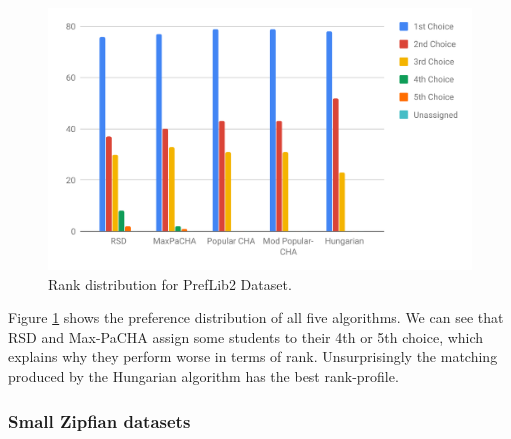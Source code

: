 \begin{figure}[h!]
  \centering
    \includegraphics[width=0.9\linewidth]{assets/plots/preflib2-ranks.pdf}    
    \caption{Rank distribution for PrefLib2 Dataset.}
    \label{fig:preflib2-rank-distribution}
\end{figure}

Figure \ref{fig:preflib2-rank-distribution} shows the preference distribution of all five algorithms. We can see that RSD and Max-PaCHA assign some students to their 4th or 5th choice, which explains why they perform worse in terms of rank. Unsurprisingly the matching produced by the Hungarian algorithm has the best rank-profile.

\subsubsection{Small Zipfian datasets}

\begin{table}[h!]
  \centering
  \caption{Average results for small Zipfian dataset with 50 runs}
  \label{tab:results-zipfian-small}
\end{table}

